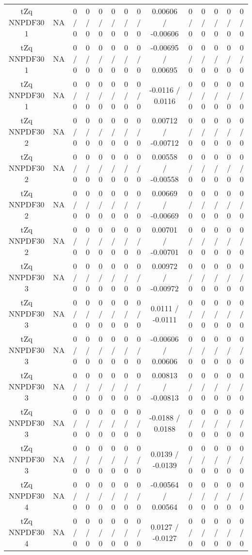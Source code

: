 \documentclass[10pt]{article}
\begin{document}
\begin{table}[htbp]
\begin{center}
\begin{tabular}{|c|c|c|c|c|c|c|c|c|c|c|c|c|c|}
  tZq NNPDF30 1 &    NA    & 0 / 0 & 0 / 0 & 0 / 0 & 0 / 0 & 0 / 0 & 0 / 0 & 0.00606 / -0.00606 & 0 / 0 & 0 / 0 & 0 / 0 & 0 / 0 & 0 / 0 \\ 
  tZq NNPDF30 1 &    NA    & 0 / 0 & 0 / 0 & 0 / 0 & 0 / 0 & 0 / 0 & 0 / 0 & -0.00695 / 0.00695 & 0 / 0 & 0 / 0 & 0 / 0 & 0 / 0 & 0 / 0 \\ 
  tZq NNPDF30 1 &    NA    & 0 / 0 & 0 / 0 & 0 / 0 & 0 / 0 & 0 / 0 & 0 / 0 & -0.0116 / 0.0116 & 0 / 0 & 0 / 0 & 0 / 0 & 0 / 0 & 0 / 0 \\ 
  tZq NNPDF30 2 &    NA    & 0 / 0 & 0 / 0 & 0 / 0 & 0 / 0 & 0 / 0 & 0 / 0 & 0.00712 / -0.00712 & 0 / 0 & 0 / 0 & 0 / 0 & 0 / 0 & 0 / 0 \\ 
  tZq NNPDF30 2 &    NA    & 0 / 0 & 0 / 0 & 0 / 0 & 0 / 0 & 0 / 0 & 0 / 0 & 0.00558 / -0.00558 & 0 / 0 & 0 / 0 & 0 / 0 & 0 / 0 & 0 / 0 \\ 
  tZq NNPDF30 2 &    NA    & 0 / 0 & 0 / 0 & 0 / 0 & 0 / 0 & 0 / 0 & 0 / 0 & 0.00669 / -0.00669 & 0 / 0 & 0 / 0 & 0 / 0 & 0 / 0 & 0 / 0 \\ 
  tZq NNPDF30 2 &    NA    & 0 / 0 & 0 / 0 & 0 / 0 & 0 / 0 & 0 / 0 & 0 / 0 & 0.00701 / -0.00701 & 0 / 0 & 0 / 0 & 0 / 0 & 0 / 0 & 0 / 0 \\ 
  tZq NNPDF30 3 &    NA    & 0 / 0 & 0 / 0 & 0 / 0 & 0 / 0 & 0 / 0 & 0 / 0 & 0.00972 / -0.00972 & 0 / 0 & 0 / 0 & 0 / 0 & 0 / 0 & 0 / 0 \\ 
  tZq NNPDF30 3 &    NA    & 0 / 0 & 0 / 0 & 0 / 0 & 0 / 0 & 0 / 0 & 0 / 0 & 0.0111 / -0.0111 & 0 / 0 & 0 / 0 & 0 / 0 & 0 / 0 & 0 / 0 \\ 
  tZq NNPDF30 3 &    NA    & 0 / 0 & 0 / 0 & 0 / 0 & 0 / 0 & 0 / 0 & 0 / 0 & -0.00606 / 0.00606 & 0 / 0 & 0 / 0 & 0 / 0 & 0 / 0 & 0 / 0 \\ 
  tZq NNPDF30 3 &    NA    & 0 / 0 & 0 / 0 & 0 / 0 & 0 / 0 & 0 / 0 & 0 / 0 & 0.00813 / -0.00813 & 0 / 0 & 0 / 0 & 0 / 0 & 0 / 0 & 0 / 0 \\ 
  tZq NNPDF30 3 &    NA    & 0 / 0 & 0 / 0 & 0 / 0 & 0 / 0 & 0 / 0 & 0 / 0 & -0.0188 / 0.0188 & 0 / 0 & 0 / 0 & 0 / 0 & 0 / 0 & 0 / 0 \\ 
  tZq NNPDF30 3 &    NA    & 0 / 0 & 0 / 0 & 0 / 0 & 0 / 0 & 0 / 0 & 0 / 0 & 0.0139 / -0.0139 & 0 / 0 & 0 / 0 & 0 / 0 & 0 / 0 & 0 / 0 \\ 
  tZq NNPDF30 4 &    NA    & 0 / 0 & 0 / 0 & 0 / 0 & 0 / 0 & 0 / 0 & 0 / 0 & -0.00564 / 0.00564 & 0 / 0 & 0 / 0 & 0 / 0 & 0 / 0 & 0 / 0 \\ 
  tZq NNPDF30 4 &    NA    & 0 / 0 & 0 / 0 & 0 / 0 & 0 / 0 & 0 / 0 & 0 / 0 & 0.0127 / -0.0127 & 0 / 0 & 0 / 0 & 0 / 0 & 0 / 0 & 0 / 0 \\ 

\end{tabular}
\end{center}
\end{table}
\end{document}
